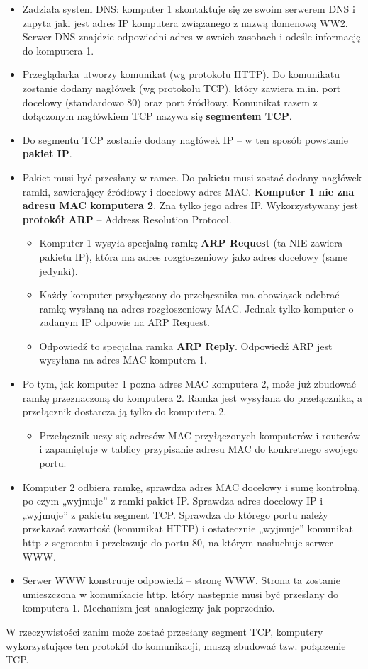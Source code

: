 \documentclass[../main.tex]{subfiles}
\begin{document}
    \begin{itemize}
        \item Zadziała system DNS: komputer 1 skontaktuje się ze swoim serwerem DNS i zapyta jaki jest adres IP komputera związanego z nazwą domenową WW2. Serwer DNS znajdzie odpowiedni adres w swoich zasobach i odeśle informację do komputera 1.
        \item Przeglądarka utworzy komunikat (wg protokołu HTTP). Do komunikatu zostanie dodany nagłówek    (wg protokołu TCP), który zawiera m.in. port docelowy (standardowo 80)    oraz port źródłowy. Komunikat razem z dołączonym nagłówkiem TCP nazywa się    \textbf{segmentem TCP}.
        \item Do segmentu TCP zostanie dodany nagłówek IP – w ten sposób powstanie \textbf{pakiet IP}.
        \item Pakiet musi być przesłany w ramce. Do pakietu musi zostać dodany nagłówek ramki, zawierający źródłowy i docelowy adres MAC. \textbf{Komputer 1 nie zna adresu MAC komputera 2}. Zna tylko jego adres IP. Wykorzystywany jest \textbf{protokół ARP} – Address Resolution Protocol.
        \begin{itemize}
            \item Komputer 1 wysyła specjalną ramkę    \textbf{ARP Request} (ta NIE zawiera pakietu IP), która ma adres rozgłoszeniowy jako adres docelowy (same jedynki).
            \item Każdy komputer przyłączony do przełącznika ma obowiązek odebrać ramkę wysłaną na adres rozgłoszeniowy MAC. Jednak tylko komputer o zadanym IP odpowie na ARP Request.
            \item Odpowiedź to specjalna ramka \textbf{ARP Reply}. Odpowiedź ARP jest wysyłana na adres MAC komputera 1.
        \end{itemize}
        \item Po tym, jak komputer 1 pozna adres MAC komputera 2, może już zbudować ramkę przeznaczoną do komputera 2. Ramka jest wysyłana do przełącznika, a przełącznik dostarcza ją tylko do komputera 2.
        \begin{itemize}
            \item Przełącznik uczy się adresów MAC przyłączonych komputerów i routerów i zapamiętuje w tablicy przypisanie adresu MAC do konkretnego swojego portu.
        \end{itemize}
        \item Komputer 2 odbiera ramkę, sprawdza adres MAC docelowy i sumę kontrolną, po czym „wyjmuje” z ramki pakiet IP. Sprawdza adres docelowy IP i „wyjmuje” z pakietu segment TCP. Sprawdza do którego portu należy przekazać zawartość (komunikat HTTP) i ostatecznie „wyjmuje” komunikat http z segmentu i przekazuje do portu 80, na którym nasłuchuje serwer WWW.
        \item Serwer WWW konstruuje odpowiedź – stronę WWW. Strona ta zostanie umieszczona w komunikacie http, który następnie musi być przesłany do komputera 1. Mechanizm jest analogiczny jak poprzednio.
    \end{itemize}
    W rzeczywistości zanim może zostać przesłany segment TCP, komputery wykorzystujące ten protokół do komunikacji, muszą zbudować tzw. połączenie TCP.
\end{document}
